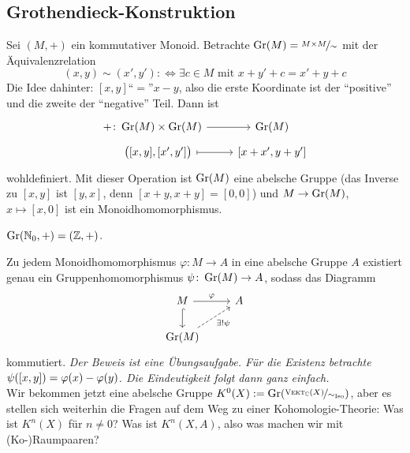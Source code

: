 \subsection*{Grothendieck-Konstruktion}
Sei $(M,+)$ ein kommutativer Monoid. Betrachte $\operatorname{Gr}(M)= \nicefrac{M \times M}{\sim}$ mit der Äquivalenzrelation
\[
	(x,y) \sim (x',y') :\iff \exists c \in M \text{ mit } x+y' +c = x' +y +c
\]
Die Idee dahinter: $[x,y]$\enquote{$=$}$x-y$, also die erste Koordinate ist der \enquote{positive} und die zweite der \enquote{negative} Teil. Dann ist 
\[
	\begin{tikzcd}[row sep=tiny]
		+ \colon \Gr(M) \times \Gr(M) \rar & \Gr(M) \\
		\quad \enbrace[\big]{[x,y] , [x',y']} \rar[mapsto] & \benbrace*{x+x',y+y'}  
	\end{tikzcd}
\]
wohldefiniert. Mit dieser Operation ist $\operatorname{Gr}(M)$ eine abelsche Gruppe (das Inverse zu $[x,y]$ ist $[y,x]$, denn $[x+y,x+y]=[0,0]$) und $M \to \operatorname{Gr}(M)$, $x  \mapsto [x,0]$ ist
ein Monoidhomomorphismus.
\begin{beispiel}
$\operatorname{Gr}(\mathbb{N}_0,+)= (\mathbb{Z},+)$.
\end{beispiel}
Zu jedem Monoidhomomorphismus $\varphi \colon M \to A$ in eine abelsche Gruppe $A$ existiert genau ein Gruppenhomomorphismus $\psi \colon \operatorname{Gr}(M) \to A$, sodass das Diagramm
\[
	\begin{tikzcd}
		M \dar[hook] \rar["\varphi"] & A \\
		\Gr(M) \urar["\exists ! \psi"', dashed]
	\end{tikzcd}
\]
kommutiert. \emph{Der Beweis ist eine Übungsaufgabe. Für die Existenz betrachte $\psi \enbrace*{[x,y]} = \varphi(x) - \varphi(y)$. Die Eindeutigkeit folgt dann ganz 
einfach.} \bigskip \\
Wir bekommen jetzt eine abelsche Gruppe $K^0(X) := \Gr \enbrace*{\nicefrac{\VEKT_{\mathds{C}}(X)}{\sim_{\Iso}}}$, aber es stellen sich weiterhin die Fragen auf dem Weg zu 
einer Kohomologie-Theorie: Was ist $K^n(X)$ für $n\not=0$? Was ist $K^n(X,A)$, also was machen wir mit (Ko-)Raumpaaren?

